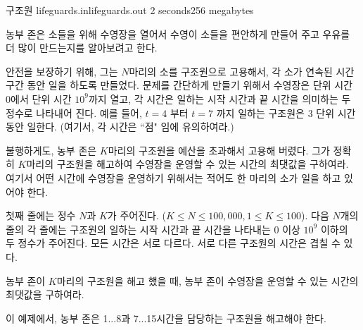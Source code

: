 \begin{problem}{구조원}
	{lifeguards.in}{lifeguards.out}
	{2 seconds}{256 megabytes}{}
	
	농부 존은 소들을 위해 수영장을 열어서 수영이 소들을 편안하게 만들어 주고 우유를 더 많이 만드는지를 알아보려고 한다.
	
	안전을 보장하기 위해, 그는 $N$마리의 소를 구조원으로 고용해서, 각 소가 연속된 시간 구간 동안 일을 하도록 만들었다. 문제를 간단하게 만들기 위해서 수영장은 단위 시간 0에서 단위 시간 $10^9$까지 열고, 각 시간은 일하는 시작 시간과 끝 시간을 의미하는 두 정수로 나타내어 진다. 예를 들어, $t=4$ 부터 $t=7$ 까지 일하는 구조원은 3 단위 시간 동안 일한다. (여기서, 각 시간은 ``점" 임에 유의하여라.)
	
	불행하게도, 농부 존은 $K$마리의 구조원을 예산을 초과해서 고용해 버렸다. 그가 정확히 $K$마리의 구조원을 해고하여 수영장을 운영할 수 있는 시간의 최댓값을 구하여라. 여기서 어떤 시간에 수영장을 운영하기 위해서는 적어도 한 마리의 소가 일을 하고 있어야 한다.
	
	
	\InputFile
	
	첫째 줄에는 정수 $N$과 $K$가 주어진다. ($K\le N \le 100,000, 1\le K \le 100$). 다음 $N$개의 줄의 각 줄에는 구조원의 일하는 시작 시간과 끝 시간을 나타내는 0 이상 $10^9$ 이하의 두 정수가 주어진다. 모든 시간은 서로 다르다. 서로 다른 구조원의 시간은 겹칠 수 있다.
	
	
	\OutputFile
	
	농부 존이 $K$마리의 구조원을 해고 했을 때, 농부 존이 수영장을 운영할 수 있는 시간의 최댓값을 구하여라.
	
	\Examples
	
	\begin{example}
	\end{example}

	\Note
	
	이 예제에서, 농부 존은 1...8과 7...15시간을 담당하는 구조원을 해고해야 한다.
	
\end{problem}


